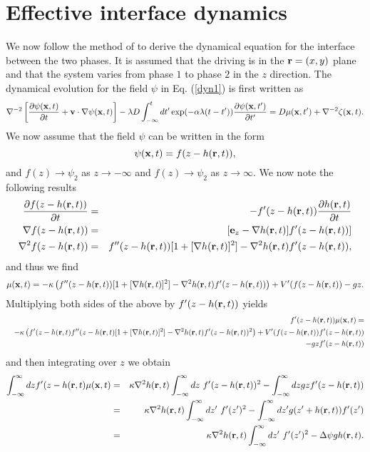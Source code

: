 \section{Effective interface dynamics}
We now follow the method of \cite{bray2001,bray2002} to derive the dynamical equation  for the interface between the two phases. It is assumed that the driving is in the ${\bf r}=(x,y)$ plane and that the system varies from phase $1$ to phase $2$ in the $z$ direction. The dynamical evolution for the field $\psi$ in Eq. (\ref{dyn1}) is first written as
\begin{equation}
\nabla^{-2}\left[\frac{\partial \psi({\bf x},t)}{\partial t}+{\bf v}\cdot\nabla\psi({\bf x}, t)\right] -\lambda D\int_{-\infty}^t dt'
\exp(-\alpha\lambda(t-t')) \frac{\partial \psi({\bf x},t')}{\partial t'}=D  \mu({\bf x},t') + \nabla^{-2} \zeta({\bf x},t).\label{eqpsi}
\end{equation}
We now assume that the field $\psi$ can be written in the form
\begin{equation}
    \psi({\bf x},t) = f(z-h({\bf r},t)),
\end{equation}
and $f(z)\to \psi_2$ as $z\to -\infty$ and $f(z)\to \psi_2$ as  $z\to \infty$.
We now note the following results
\begin{eqnarray}
\frac{\partial f(z-h({\bf r},t))}{\partial t} &=& -f'(z-h({\bf r},t))\frac{\partial h({\bf r},t)}{\partial t}\\
\nabla f(z-h({\bf r},t) )&=& [{\bf e}_z -\nabla h({\bf r},t)]f'(z-h({\bf r},t))]\\
\nabla^2 f(z-h({\bf r},t)) &=& f''(z-h({\bf r},t))[1 + [\nabla h({\bf r},t)]^2] -\nabla^2 h({\bf r},t)f'(z-h({\bf r},t)),
\end{eqnarray}
and thus we find
\begin{equation}
    \mu({\bf x},t)= -\kappa\left(f''(z-h({\bf r},t))[1 + [\nabla h({\bf r},t)]^2] -\nabla^2 h({\bf r},t)f'(z-h({\bf r},t))\right) + V'(f(z-h({\bf r},t)) - gz .
\end{equation}
Multiplying both sides of the above by $f'(z-h({\bf r},t))$ yields
\begin{eqnarray}
&&f'(z-h({\bf r},t))\mu({\bf x},t)=\nonumber \\
 &&-\kappa\left(f'(z-h({\bf r},t)f''(z-h({\bf r},t)[1 + [\nabla h({\bf r},t)]^2] -\nabla^2 h({\bf r},t)f'(z-h({\bf r},t))^2\right) + V'(f(z-h({\bf r},t))f'(z-h({\bf r},t))\nonumber \\
 &&- gz f'(z-h({\bf r},t)) \nonumber
\end{eqnarray}
and then integrating over $z$ we obtain
\begin{eqnarray}
\int_{-\infty}^\infty dz f'(z-h({\bf r},t)\mu(\bx,t)&=& \kappa \nabla^2 h({\bf r},t)\int_{-\infty}^\infty dz\ f'(z-h({\bf r},t))^2 - \int_{-\infty}^\infty dz gz f'(z-h({\bf r},t))\nonumber \\&=&
\kappa\nabla^2 h({\bf r},t)\int_{-\infty}^\infty dz'\ f'(z')^2 - \int_{-\infty}^\infty dz' g(z' +h({\bf r},t)) f'(z')\nonumber \\
&=& \kappa\nabla^2 h({\bf r},t)\int_{-\infty}^\infty dz' \ f'(z')^2 -\Delta\psi g h({\bf r},t).
\end{eqnarray}
